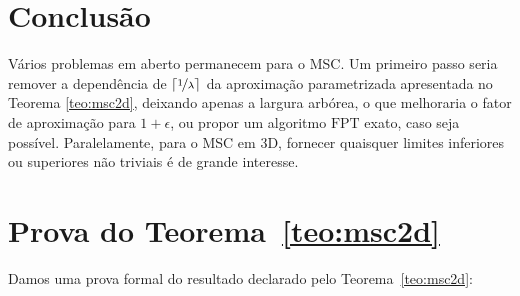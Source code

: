\documentclass[12pt]{article}
\DeclarePairedDelimiter\ceil{\lceil}{\rceil}
\begin{document}
\section{Conclusão}

Vários problemas em aberto permanecem para o MSC. Um primeiro passo seria remover a dependência de $\ceil{\nicefrac{1}{\lambda}}$ da aproximação parametrizada apresentada no Teorema \ref{teo:msc2d}, deixando apenas a largura arbórea, o que melhoraria o fator de aproximação para $1+\epsilon$, ou propor um algoritmo $\text{FPT}$ exato, caso seja possível.
%
Paralelamente, para o MSC em 3D, fornecer quaisquer limites inferiores ou superiores não triviais é de grande interesse.




\clearpage
\appendix

\section{Prova do Teorema~\ref{teo:msc2d}}
\label{app:recurrences}

Damos uma prova formal do resultado declarado pelo Teorema~\ref{teo:msc2d}:
\end{document}
